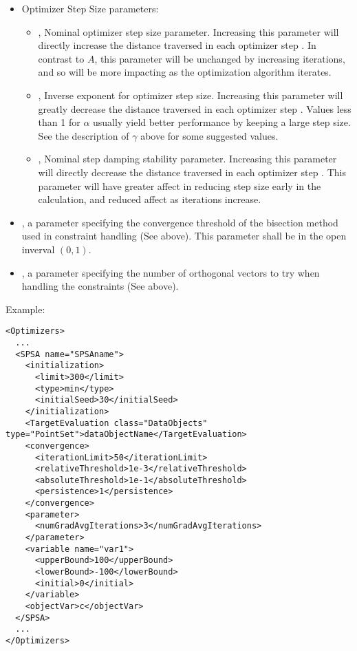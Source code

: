 \begin{itemize}
\begin{itemize}
  \item Optimizer Step Size parameters:
    \begin{itemize}
      \item {},  Nominal optimizer step size parameter.  Increasing
        this parameter will directly increase the distance traversed in each optimizer step
        \cite{spall1998implementation}. In contrast to $A$, this parameter will be unchanged by increasing
        iterations, and so will be more impacting as the optimization algorithm iterates. 
      \item {},  Inverse exponent for optimizer step size.
        Increasing this parameter will greatly decrease the distance traversed in each optimizer step
        \cite{spall1998implementation}. Values less than 1 for $\alpha$ usually yield better performance by
        keeping a large step size. See the description of $\gamma$ above for some suggested values. 
      \item {},  Nominal step damping stability parameter.  Increasing this
        parameter will directly decrease the distance traversed in each optimizer step
        \cite{spall1998implementation}. This parameter will have greater affect in reducing step size early in
        the calculation, and reduced affect as iterations increase. 
    \end{itemize}
  \item {},  a parameter specifying the convergence threshold of the
  bisection method used in constraint handling (See above). This parameter shall be in the open inverval $(0,1)$.
  \item {},  a parameter specifying the number of orthogonal vectors to try
  when handling the constraints (See above).
  \end{itemize}
\end{itemize}


Example:
\begin{lstlisting}[style=XML]
<Optimizers>
  ...
  <SPSA name="SPSAname">
    <initialization>
      <limit>300</limit>
      <type>min</type>
      <initialSeed>30</initialSeed>
    </initialization>
    <TargetEvaluation class="DataObjects" type="PointSet">dataObjectName</TargetEvaluation>
    <convergence>
      <iterationLimit>50</iterationLimit>
      <relativeThreshold>1e-3</relativeThreshold>
      <absoluteThreshold>1e-1</absoluteThreshold>
      <persistence>1</persistence>
    </convergence>
    <parameter>
      <numGradAvgIterations>3</numGradAvgIterations>
    </parameter>
    <variable name="var1">
      <upperBound>100</upperBound>
      <lowerBound>-100</lowerBound>
      <initial>0</initial>
    </variable>
    <objectVar>c</objectVar>
  </SPSA>
  ...
</Optimizers>
\end{lstlisting}

